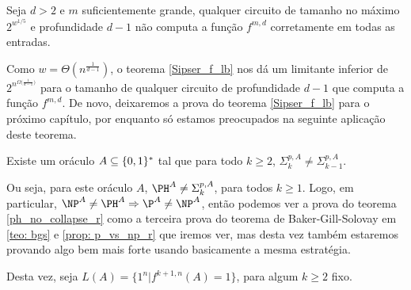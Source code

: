 \begin{teo} \label{Sipser_f_lb}

Seja $d > 2$ e $m$ suficientemente grande, qualquer circuito de tamanho no máximo $2^{w^{1/5}}$ e profundidade $d - 1$ não computa a função $f^{m, d}$ corretamente em todas as entradas.

\end{teo}

Como $w = \Theta(n^{\frac{1}{d - 1}})$, o teorema \ref{Sipser_f_lb} nos dá um limitante inferior de $2^{n^{\Omega \big(\frac{1}{d - 1} \big)}}$ para o tamanho de qualquer circuito de profundidade $d - 1$ que computa a função $f^{m, d}$. De novo, deixaremos a prova do teorema \ref{Sipser_f_lb} para o próximo capítulo, por enquanto só estamos preocupados na seguinte aplicação deste teorema.

\begin{teo} \label{ph_no_collapse_r}
Existe um oráculo $A \subseteq \{0, 1\}^{*}$ tal que para todo $k \geq 2$, $\Sigma_{k}^{p, A} \neq \Sigma_{k - 1}^{p, A}$.
\end{teo}

Ou seja, para este oráculo $A$, $\PH^{A} \neq \Sigma_{k}^{p, A}$, para todos $k \geq 1$. Logo, em particular, $\NP^{A} \neq \PH^{A} \Rightarrow \P^{A} \neq \NP^{A}$, então podemos ver a prova do teorema \ref{ph_no_collapse_r} como a terceira prova do teorema de Baker-Gill-Solovay em \ref{teo: bgs} e \ref{prop: p_vs_np_r} que iremos ver, mas desta vez também estaremos provando algo bem mais forte usando basicamente a mesma estratégia.

Desta vez, seja $L(A) = \{1^{n} \lvert f^{k + 1, n}(A) = 1\}$, para algum $k \geq 2$ fixo.


